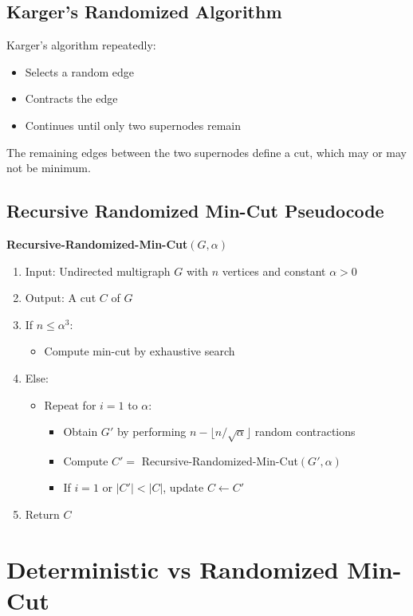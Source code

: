 \documentclass[12pt]{article}
\begin{document}
\subsection{Karger’s Randomized Algorithm}
Karger’s algorithm repeatedly:
\begin{itemize}
    \item Selects a random edge
    \item Contracts the edge
    \item Continues until only two supernodes remain
\end{itemize}

The remaining edges between the two supernodes define a cut, which may or may not be minimum.

\subsection{Recursive Randomized Min-Cut Pseudocode}

\textbf{Recursive-Randomized-Min-Cut$(G,\alpha)$}
\begin{enumerate}
    \item Input: Undirected multigraph $G$ with $n$ vertices and constant $\alpha>0$
    \item Output: A cut $C$ of $G$
    \item If $n \le \alpha^3$:
    \begin{itemize}
        \item Compute min-cut by exhaustive search
    \end{itemize}
    \item Else:
    \begin{itemize}
        \item Repeat for $i=1$ to $\alpha$:
        \begin{itemize}
            \item Obtain $G'$ by performing $n-\lfloor n/\sqrt{\alpha}\rfloor$ random contractions
            \item Compute $C' =$ Recursive-Randomized-Min-Cut$(G',\alpha)$
            \item If $i=1$ or $|C'|<|C|$, update $C \leftarrow C'$
        \end{itemize}
    \end{itemize}
    \item Return $C$
\end{enumerate}

\section{Deterministic vs Randomized Min-Cut}
\end{document}
